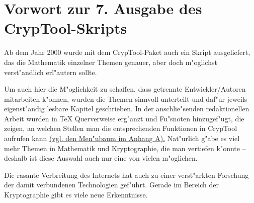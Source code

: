 

\newpage
\section*{Vorwort zur 7. Ausgabe des CrypTool-Skripts}

Ab dem Jahr 2000 wurde mit dem CrypTool-Paket auch ein Skript 
ausgeliefert, das die Mathematik einzelner Themen genauer, aber doch 
m"oglichst verst"andlich erl"autern sollte.

Um auch hier die M"oglichkeit zu schaffen, dass getrennte Entwickler/Autoren
mitarbeiten k"onnen, wurden die Themen sinnvoll unterteilt und daf"ur jeweils
eigenst"andig lesbare Kapitel geschrieben. In der anschlie"senden redaktionellen
Arbeit wurden in TeX Querverweise erg"anzt und Fu"snoten hinzugef"ugt, die
zeigen, an welchen Stellen man die entsprechenden Funktionen in
CrypTool aufrufen kann 
\hyperlink{appendix-menutree}{(vgl. den Men"ubaum im Anhang A).}
Nat"urlich g"abe es viel mehr Themen in Mathematik und Kryptographie, die
man vertiefen k"onnte -- deshalb ist diese Auswahl auch nur eine von
vielen m"oglichen.

Die rasante Verbreitung des Internets hat auch zu einer verst"arkten 
Forschung der damit verbundenen Technologien gef"uhrt. Gerade im Bereich 
der Kryptographie gibt es viele neue Erkenntnisse.

